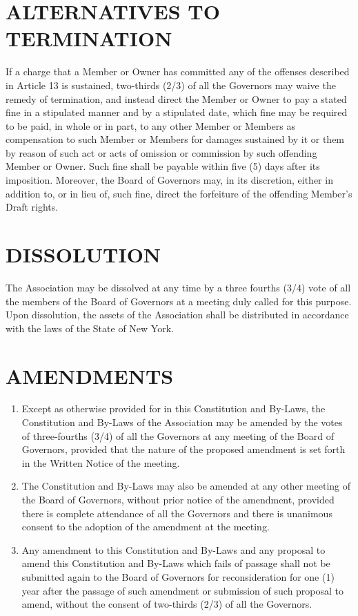 \documentclass[]{book}
\providecommand{\tightlist}{%
  \setlength{\itemsep}{0pt}\setlength{\parskip}{0pt}}
\begin{document}
\hypertarget{alternatives-to-termination}{%
\section{ALTERNATIVES TO TERMINATION}\label{alternatives-to-termination}}

If a charge that a Member or Owner has committed any of the offenses described in Article 13 is sustained, two-thirds (2/3) of all the Governors may waive the remedy of termination, and instead direct the Member or Owner to pay a stated fine in a stipulated manner and by a stipulated date, which fine may be required to be paid, in whole or in part, to any other Member or Members as compensation to such Member or Members for damages sustained by it or them by reason of such act or acts of omission or commission by such offending Member or Owner. Such fine shall be payable within five (5) days after its imposition. Moreover, the Board of Governors may, in its discretion, either in addition to, or in lieu of, such fine, direct the forfeiture of the offending Member's Draft rights.

\hypertarget{dissolution}{%
\section{DISSOLUTION}\label{dissolution}}

The Association may be dissolved at any time by a three fourths (3/4) vote of all the members of the Board of Governors at a meeting duly called for this purpose. Upon dissolution, the assets of the Association shall be distributed in accordance with the laws of the State of New York.

\hypertarget{amendments}{%
\section{AMENDMENTS}\label{amendments}}

\begin{enumerate}
\def\labelenumi{(\alph{enumi})}
\tightlist
\item
  Except as otherwise provided for in this Constitution and By-Laws, the Constitution and By-Laws of the Association may be amended by the votes of three-fourths (3/4) of all the Governors at any meeting of the Board of Governors, provided that the nature of the proposed amendment is set forth in the Written Notice of the meeting.
\item
  The Constitution and By-Laws may also be amended at any other meeting of the Board of Governors, without prior notice of the amendment, provided there is complete attendance of all the Governors and there is unanimous consent to the adoption of the amendment at the meeting.
\item
  Any amendment to this Constitution and By-Laws and any proposal to amend this Constitution and By-Laws which fails of passage shall not be submitted again to the Board of Governors for reconsideration for one (1) year after the passage of such amendment or submission of such proposal to amend, without the consent of two-thirds (2/3) of all the Governors.
\end{enumerate}
\end{document}

